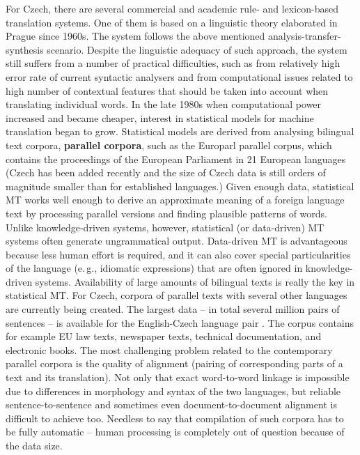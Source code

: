 \begin{multicols}{2}
For Czech, there are several commercial and academic rule- and lexicon-based translation systems. One of them is based on a linguistic theory elaborated in Prague since 1960s. The system follows the above mentioned analysis-transfer-synthesis scenario. Despite the linguistic adequacy of such approach, the system still suffers from a number of practical difficulties, such as from relatively high error rate of current syntactic analysers and from computational issues related to high number of contextual features that should be taken into account when translating individual words.
In the late 1980s when computational power increased and became cheaper, interest in statistical models for machine translation began to grow. Statistical models are derived from analysing bilingual text corpora, \textbf{parallel corpora}, such as the Europarl parallel corpus, which contains the proceedings of the European Parliament in 21 European languages (Czech has been added recently and the size of Czech data is still orders of magnitude smaller than for established languages.) Given enough data, statistical MT works well enough to derive an approximate meaning of a foreign language text by processing parallel versions and finding plausible patterns of words. Unlike knowledge-driven systems, however, statistical (or data-driven) MT systems often generate ungrammatical output. Data-driven MT is advantageous because less human effort is required, and it can also cover special particularities of the language (e.\,g., idiomatic expressions) that are often ignored in knowledge-driven systems. 
Availability of large amounts of bilingual texts is really the key in statistical MT. For Czech, corpora of parallel texts with several other languages are currently being created. The largest data – in total several million pairs of sentences – is available for the English-Czech language pair \cite{Note20}. The corpus contains for example EU law texts, newspaper texts, technical documentation, and electronic books. The most challenging problem related to the contemporary parallel corpora is the quality of alignment (pairing of corresponding parts of a text and its translation). Not only that exact word-to-word linkage is impossible due to differences in morphology and syntax of the two languages, but reliable sentence-to-sentence and sometimes even document-to-document alignment is difficult to achieve too. Needless to say that compilation of such corpora has to be fully automatic – human processing is completely out of question because of the data size.


\end{multicols}
